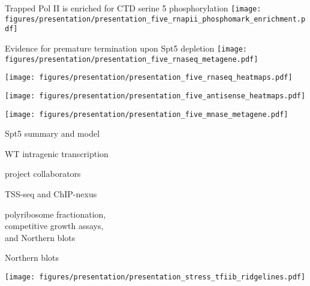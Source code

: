 \documentclass[aspectratio=169, 12pt]{beamer}
\begin{document}
\begin{frame}{Trapped Pol II is enriched for CTD serine 5 phosphorylation}
    \texttt{[image: figures/presentation/presentation\_five\_rnapii\_phosphomark\_enrichment.pdf]}
\end{frame}

\begin{frame}{Evidence for premature termination upon Spt5 depletion}
    \centering
    \texttt{[image: figures/presentation/presentation\_five\_rnaseq\_metagene.pdf]}
\end{frame}

\begin{frame}[t]
    \centering
    \texttt{[image: figures/presentation/presentation\_five\_rnaseq\_heatmaps.pdf]}
\end{frame}

\begin{frame}[t]
    \texttt{[image: figures/presentation/presentation\_five\_antisense\_heatmaps.pdf]}
\end{frame}

\begin{frame}[t]
    \texttt{[image: figures/presentation/presentation\_five\_mnase\_metagene.pdf]}
\end{frame}

\begin{frame}{Spt5 summary and model}
\end{frame}

\begin{frame}{WT intragenic transcription}
\end{frame}

\begin{frame}{project collaborators}
    \begin{description}[align=right, labelwidth=0.5\textwidth, leftmargin=!]
        \item [Steve Doris] TSS-seq and ChIP-nexus
        \item [Dan Spatt] polyribosome fractionation,\\competitive growth assays,\\and Northern blots
        \item [James Warner] Northern blots
    \end{description}
\end{frame}

\begin{frame}[t]
    \texttt{[image: figures/presentation/presentation\_stress\_tfiib\_ridgelines.pdf]}
\end{frame}
\end{document}
